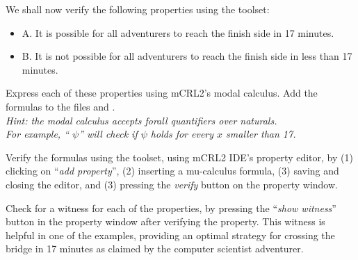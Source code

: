 \documentclass[11pt]{article}
\theoremstyle{myplain}
\theoremstyle{definition} %
\begin{document}
\begin{exercise}
We shall now verify the following properties using the toolset:
\begin{itemize}
  \item A. It is possible for all adventurers to reach the finish side in 17 minutes.
  \item B. It is not possible for all adventurers to reach the finish side in less than 17 minutes.
\end{itemize}

Express each of these properties using mCRL2's modal calculus. Add the formulas to the files  and .
\\[2mm]
\emph{Hint: the modal calculus accepts forall quantifiers over naturals.}
\\\emph{For example, `` $\psi$'' will check if $\psi$ holds for every $x$ smaller than 17.}
\end{exercise}


\bigskip
\begin{exercise}
Verify the formulas using the toolset, using mCRL2 IDE's property editor, by (1) clicking on ``\emph{add property}'', (2) inserting a mu-calculus formula, (3) saving and closing the editor, and (3) pressing the \emph{verify} button on the property window.
\end{exercise}

\bigskip
\begin{exercise}
Check for a witness for each of the properties, by pressing the ``\emph{show witness}'' button in the property window after verifying the property. This witness is helpful in one of the examples, providing an optimal strategy for crossing the bridge in 17 minutes as claimed by the computer scientist adventurer.
\end{exercise}




\end{document}
